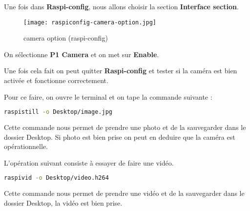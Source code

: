             \begin{flushleft}
                
                Une fois dans \textbf{Raspi-config}, nous allons choisir la section \textbf{Interface section}.
            
                \begin{figure}[ht]
                    \centering
                    \texttt{[image: raspiconfig-camera-option.jpg]} 
                    \caption{camera option (raspi-config)}
                \end{figure}

                On sélectionne \textbf{P1 Camera} et on met sur \textbf{Enable}.

                \vspace{0.2cm}

                Une fois cela fait on peut quitter \textbf{Raspi-config} et tester si la caméra est bien activée et fonctionne correctement.

                \vspace{0.2cm}

                Pour ce faire, on ouvre le terminal et on tape la commande suivante :

                \begin{flushleft}
                    \begin{lstlisting}[language=bash]
                        raspistill -o Desktop/image.jpg
                    \end{lstlisting}
                \end{flushleft}

                Cette commande nous permet de prendre une photo et de la sauvegarder dans le dossier Desktop. Si photo est bien prise on peut en deduire que la caméra est opérationnelle. 
                
                L'opération suivant consiste à essayer de faire une vidéo.

                \begin{flushleft}
                    \begin{lstlisting}[language=bash]
                        raspivid -o Desktop/video.h264
                    \end{lstlisting}
                \end{flushleft}

                Cette commande nous permet de prendre une vidéo et de la sauvegarder dans le dossier Desktop, la vidéo est bien prise.
                
            \end{flushleft}

